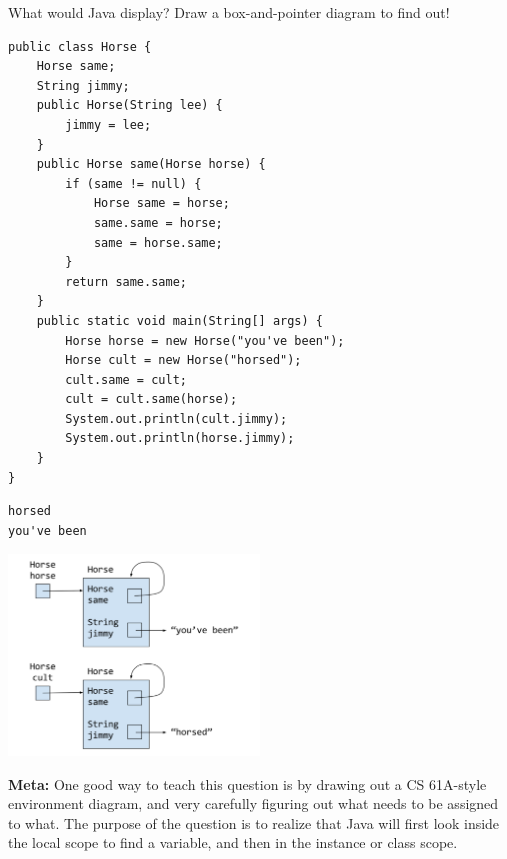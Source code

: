 \begin{blocksection}
\question What would Java display? Draw a box-and-pointer diagram to find out!

\begin{lstlisting}
public class Horse {
    Horse same;
    String jimmy;
    public Horse(String lee) {
        jimmy = lee;
    }
    public Horse same(Horse horse) {
        if (same != null) {
            Horse same = horse;
            same.same = horse;
            same = horse.same;
        }
        return same.same;
    }
    public static void main(String[] args) {
        Horse horse = new Horse("you've been");
        Horse cult = new Horse("horsed");
        cult.same = cult;
        cult = cult.same(horse);
        System.out.println(cult.jimmy);
        System.out.println(horse.jimmy);
    }
}
\end{lstlisting}

\begin{solution}[1.5in]
\begin{verbatim}
horsed
you've been
\end{verbatim}

\includegraphics[width=0.5\textwidth]{samehorse}

\textbf{Meta:} One good way to teach this question is by drawing out a CS
61A-style environment diagram, and very carefully figuring out what needs to be
assigned to what. The purpose of the question is to realize that Java will
first look inside the local scope to find a variable, and then in the instance
or class scope.
\end{solution}
\end{blocksection}
